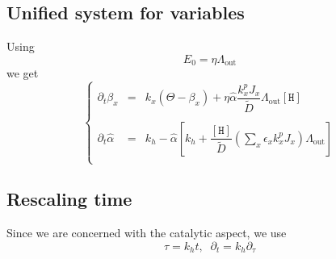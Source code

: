 \documentclass[aps,onecolumn,12pt]{revtex4}
\newcommand{\mychem}[1]{\mathtt{#1}}
\newcommand{\myconc}[1]{\left\lbrack{#1}\right\rbrack}
\newcommand{\spproton}{\mychem{H}}
\newcommand{\proton}{\myconc{\spproton}}
\newcommand{\LiAll}{\Lambda}
\newcommand{\LiAllOut}{{\LiAll}_{\mathrm{out}}}
\begin{document}
\subsection{Unified system for variables}
Using 
\begin{equation}
	E_0 = \eta \LiAllOut
\end{equation}
we get
\begin{equation}
\left\lbrace
\begin{array}{rcl}
\partial_t \beta_x  & = &  k_x \left(\Theta -\beta_x \right) + \eta \hat\alpha \dfrac{ k_x^p J_x}{\tilde{D}} \LiAllOut \proton\\
\\
	\partial_t \hat\alpha & = & k_h - \hat\alpha \left\lbrack k_h+ \dfrac{\proton}{\tilde{D}} \left(\sum_x \epsilon_x k_x^p J_x \right) \LiAllOut \right] 
		\\
\end{array}
\right.
\end{equation}


\subsection{Rescaling time}
Since we are concerned with the catalytic aspect, we use
\begin{equation}
	\tau = k_h t, \;\;\partial_t = k_h \partial_\tau
\end{equation}
\end{document}
